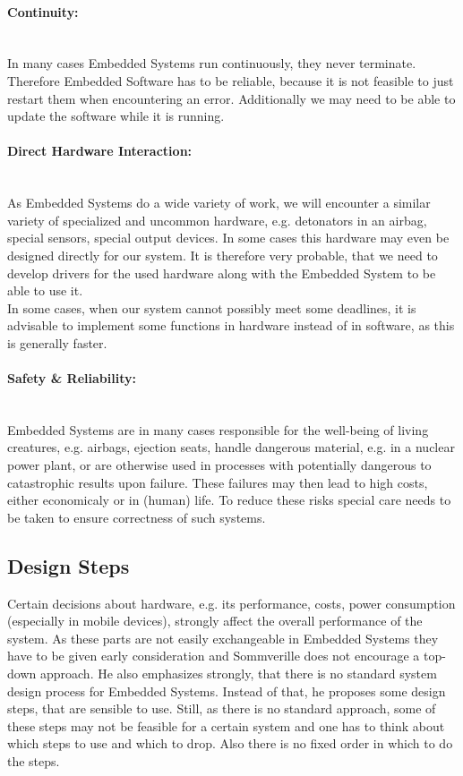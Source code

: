\documentclass[10pt,a4paper,titlepage,draft]{scrartcl} %
\begin{document}
\paragraph{Continuity:} \ \\
In many cases Embedded Systems run continuously, they never terminate.
Therefore Embedded Software has to be reliable, because it is not feasible to just restart them when encountering an error.
Additionally we may need to be able to update the software while it is running.

\paragraph{Direct Hardware Interaction:} \ \\
As Embedded Systems do a wide variety of work, we will encounter a similar variety of specialized and uncommon hardware, e.g. detonators in an airbag, special sensors, special output devices.
In some cases this hardware may even be designed directly for our system.
It is therefore very probable, that we need to develop drivers for the used hardware along with the Embedded System to be able to use it.
\\
In some cases, when our system cannot possibly meet some deadlines, it is advisable to implement some functions in hardware instead of in software, as this is generally faster.

\paragraph{Safety \& Reliability:} \ \\
Embedded Systems are in many cases responsible for the well-being of living creatures, e.g. airbags, ejection seats, handle dangerous material, e.g. in a nuclear power plant, or are otherwise used in processes with potentially dangerous to catastrophic results upon failure.
These failures may then lead to high costs, either economicaly or in (human) life.
To reduce these risks special care needs to be taken to ensure correctness of such systems.

\subsection{Design Steps}
Certain decisions about hardware, e.g. its performance, costs, power consumption (especially in mobile devices), strongly affect the overall performance of the system.
As these parts are not easily exchangeable in Embedded Systems they have to be given early consideration and Sommverille does not encourage a top-down approach\cite[p. 540]{sommerville}.
He also emphasizes strongly, that there is no standard system design process for Embedded Systems.
Instead of that, he proposes some design steps, that are sensible to use.
Still, as there is no standard approach, some of these steps may not be feasible for a certain system and one has to think about which steps to use and which to drop.
Also there is no fixed order in which to do the steps.
\end{document}
